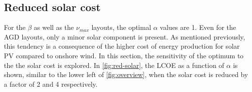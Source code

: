 \documentclass[a4paper, 5p, sort&compress]{elsarticle}%
\begin{document}
%
%

\subsection{Reduced solar cost}
\label{sec:reduced-solar-cost}

For the $\beta$ as well as the $\nu_{max}$ layouts, the optimal
$\alpha$ values are 1. Even for the AGD layouts, only a minor solar
component is present. As mentioned previously, this tendency is a
consequence of the higher cost of energy production for solar PV
compared to onshore wind. In this section, the sensitivity of the
optimum to the the solar cost is explored. In \cref{fig:red-solar}, the
LCOE as a function of $\alpha$ is shown, similar to the lower left of
\cref{fig:overview}, when the solar cost is reduced by a factor of 2
and 4 respectively.
\end{document}
